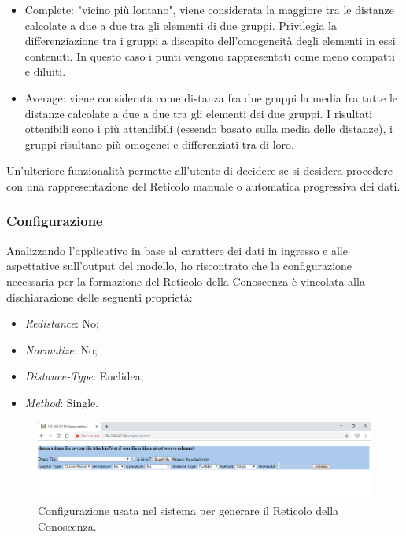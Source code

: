 \begin{itemize}
\begin{itemize}
\item Complete: "vicino pi\`u lontano", viene considerata la maggiore tra le distanze calcolate a due a due tra gli elementi di due gruppi. Privilegia la differenziazione tra i gruppi a discapito dell'omogeneit\`a degli elementi in essi contenuti. In questo caso i punti vengono rappresentati come meno compatti e diluiti.
\item Average: viene considerata come distanza fra due gruppi la media fra tutte le distanze calcolate a due a due tra gli elementi dei due gruppi. I risultati ottenibili sono i pi\`u attendibili (essendo basato sulla media delle distanze), i gruppi risultano pi\`u omogenei e differenziati tra di loro.
\end{itemize}
\end{itemize}
\noindent
Un'ulteriore funzionalit\`a permette all'utente di decidere se si desidera procedere con una rappresentazione del Reticolo manuale o automatica progressiva dei dati.

\subsubsection{Configurazione}
\label{configurazione}
Analizzando l'applicativo in base al carattere dei dati in ingresso e alle aspettative sull'output del modello, ho riscontrato che la configurazione necessaria per la formazione del Reticolo della Conoscenza \`e vincolata alla dischiarazione delle seguenti propriet\`a:
\begin{itemize}
\item \textit{Redistance}: No;
\item  \textit{Normalize}: No;
\item \textit{Distance-Type}: Euclidea;
\item \textit{Method}: Single.
\end{itemize}
\noindent
\begin{figure}[H]
\centering
	\includegraphics[width=1\linewidth]{./image/img-configurazione_reticolo.png}
	\caption{Configurazione usata nel sistema per generare il Reticolo della Conoscenza.}
	\label{Configurazione usata nel sistema per generare il Reticolo della Conoscenza.}
\end{figure}
\noindent

